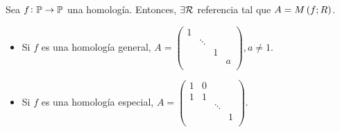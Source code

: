 \begin{prop}
    Sea $f \colon \mathbb{P} \to \mathbb{P}$ una homología. Entonces, $\exists \mathcal{R}$ referencia tal que $A=M\left( f ; R \right)$.
    \begin{itemize}
        \item Si $f$ es una homología general, $A=
            \begin{pmatrix}
                1 & & & \\
                & \ddots & & \\
                & & 1 & \\
                & & & a \\
            \end{pmatrix}, a \neq 1.$
        \item Si $f$ es una homología especial, $A=
            \begin{pmatrix}
                1 & 0 & & \\
                1 & 1 & & \\
                & & \ddots &  \\
                & & & 1 \\
            \end{pmatrix}.$
    \end{itemize}
\end{prop}

